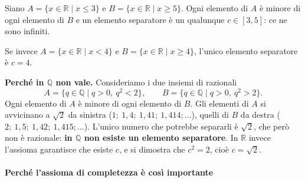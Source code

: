 \documentclass[11pt,a4paper]{article}
\begin{document}
\begin{esempio}
Siano $A = \{x \in \mathbb{R} \mid x \leq 3\}$ e $B = \{x \in \mathbb{R} \mid x \geq 5\}$. Ogni elemento di $A$ è minore di ogni elemento di $B$ e un elemento separatore è un qualunque $c \in [3, 5]$: ce ne sono infiniti.

Se invece $A = \{x \in \mathbb{R} \mid x < 4\}$ e $B = \{x \in \mathbb{R} \mid x \geq 4\}$, l'unico elemento separatore è $c = 4$.
\end{esempio}

\textbf{Perché in $\mathbb{Q}$ non vale.} Consideriamo i due insiemi di
razionali
\[
A = \{q \in \mathbb{Q} \mid q > 0,\ q^2 < 2\}, \qquad
B = \{q \in \mathbb{Q} \mid q > 0,\ q^2 > 2\}.
\]
Ogni elemento di $A$ è minore di ogni elemento di $B$. Gli elementi di $A$
si avvicinano a $\sqrt{2}$ da sinistra ($1;\ 1{,}4;\ 1{,}41;\ 1{,}414;
\dots$), quelli di $B$ da destra ($2;\ 1{,}5;\ 1{,}42;\ 1{,}415; \dots$).
L'unico numero che potrebbe separarli è $\sqrt{2}$, che però non è
razionale: \textbf{in $\mathbb{Q}$ non esiste un elemento separatore}.
In $\mathbb{R}$ invece l'assioma garantisce che esiste $c$, e si dimostra
che $c^2 = 2$, cioè $c = \sqrt{2}$.

\paragraph*{Perché l'assioma di completezza è così importante}
\end{document}
